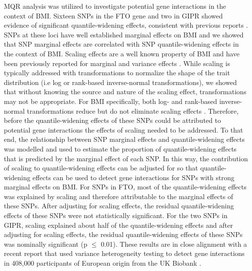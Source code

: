 \documentclass[12pt]{article}
\begin{document}
MQR analysis was utilized to investigate potential gene interactions in the context of BMI. Sixteen SNPs in the FTO gene and two in GIPR showed evidence of significant quantile-widening effects, consistent with previous reports \cite{Abadi:2017gaa, Young:2018ej}. SNPs at these loci have well established marginal effects on BMI and we showed that SNP marginal effects are correlated with SNP quantile-widening effects in the context of BMI. Scaling effects are a well known property of BMI and have been previously reported for marginal and variance effects \cite{Yang:2015iw,Young:2018ej}. While scaling is typically addressed with transformations to normalize the shape of the trait distribution (i.e log or rank-based inverse-normal transformations), we showed that without knowing the source and nature of the scaling effect, transformations may not be appropriate. For BMI specifically, both log- and rank-based inverse-normal transformations reduce but do not eliminate scaling effects \cite{Young:2018ej}. Therefore, before the quantile-widening effects of these SNPs could be attributed to potential gene interactions the effects of scaling needed to be addressed. To that end, the relationship between SNP marginal effects and quantile-widening effects was modelled and used to estimate the proportion of quantile-widening effects that is predicted by the marginal effect of each SNP. In this way, the contribution of scaling to quantile-widening effects can be adjusted for so that quantile-widening effects can be used to detect gene interactions for SNPs with strong marginal effects on BMI. For SNPs in FTO, most of the quantile-widening effects was explained by scaling and therefore attributable to the marginal effects of these SNPs. After adjusting for scaling effects, the residual quantile-widening effects of these SNPs were not statistically significant. For the two SNPs in GIPR, scaling explained about half of the quantile-widening effects and after adjusting for scaling effects, the residual quantile-widening effects of these SNPs was nominally significant (p $\leq$ 0.01). These results are in close alignment with a recent report that used variance heterogeneity testing to detect gene interactions in 408,000 participants of European origin from the UK Biobank \cite{Young:2018ej}. 
\end{document}
